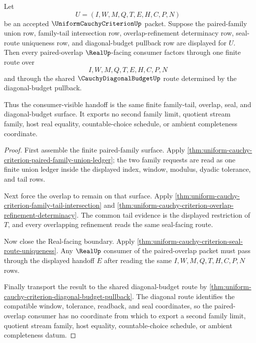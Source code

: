 \begin{theorem}
\label{thm:uniform-cauchy-criterion-paired-overlap-real-seal-determinacy}
Let
$$
U=(I,W,M,Q,T,E,H,C,P,N)
$$
be an accepted $\UniformCauchyCriterionUp$ packet. Suppose the paired-family union row, family-tail intersection row, overlap-refinement determinacy row, seal-route uniqueness row, and diagonal-budget pullback row are displayed for $U$. Then every paired-overlap $\RealUp$-facing consumer factors through one finite route over
$$
I,W,M,Q,T,E,H,C,P,N
$$
and through the shared $\CauchyDiagonalBudgetUp$ route determined by the diagonal-budget pullback.

Thus the consumer-visible handoff is the same finite family-tail, overlap, seal, and diagonal-budget surface. It exports no second family limit, quotient stream family, host real equality, countable-choice schedule, or ambient completeness coordinate.
\end{theorem}
\begin{proof}
First assemble the finite paired-family surface. Apply \autoref{thm:uniform-cauchy-criterion-paired-family-union-ledger}; the two family requests are read as one finite union ledger inside the displayed index, window, modulus, dyadic tolerance, and tail rows.

Next force the overlap to remain on that surface. Apply \autoref{thm:uniform-cauchy-criterion-family-tail-intersection} and \autoref{thm:uniform-cauchy-criterion-overlap-refinement-determinacy}. The common tail evidence is the displayed restriction of $T$, and every overlapping refinement reads the same seal-facing route.

Now close the Real-facing boundary. Apply \autoref{thm:uniform-cauchy-criterion-seal-route-uniqueness}. Any $\RealUp$ consumer of the paired-overlap packet must pass through the displayed handoff $E$ after reading the same $I,W,M,Q,T,H,C,P,N$ rows.

Finally transport the result to the shared diagonal-budget route by \autoref{thm:uniform-cauchy-criterion-diagonal-budget-pullback}. The diagonal route identifies the compatible window, tolerance, readback, and seal coordinates, so the paired-overlap consumer has no coordinate from which to export a second family limit, quotient stream family, host equality, countable-choice schedule, or ambient completeness datum.
\end{proof}

